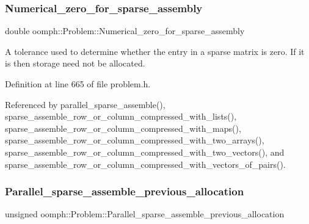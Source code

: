 \mbox{\label{classoomph_1_1Problem_ad1a1ffc2bd685377ce7213452876b127}} 
\subsubsection{\texorpdfstring{Numerical\+\_\+zero\+\_\+for\+\_\+sparse\+\_\+assembly}{Numerical\_zero\_for\_sparse\_assembly}}
{\footnotesize\ttfamily double oomph\+::\+Problem\+::\+Numerical\+\_\+zero\+\_\+for\+\_\+sparse\+\_\+assembly\hspace{0.3cm}{\ttfamily [protected]}}



A tolerance used to determine whether the entry in a sparse matrix is zero. If it is then storage need not be allocated. 



Definition at line 665 of file problem.\+h.



Referenced by parallel\+\_\+sparse\+\_\+assemble(), sparse\+\_\+assemble\+\_\+row\+\_\+or\+\_\+column\+\_\+compressed\+\_\+with\+\_\+lists(), sparse\+\_\+assemble\+\_\+row\+\_\+or\+\_\+column\+\_\+compressed\+\_\+with\+\_\+maps(), sparse\+\_\+assemble\+\_\+row\+\_\+or\+\_\+column\+\_\+compressed\+\_\+with\+\_\+two\+\_\+arrays(), sparse\+\_\+assemble\+\_\+row\+\_\+or\+\_\+column\+\_\+compressed\+\_\+with\+\_\+two\+\_\+vectors(), and sparse\+\_\+assemble\+\_\+row\+\_\+or\+\_\+column\+\_\+compressed\+\_\+with\+\_\+vectors\+\_\+of\+\_\+pairs().

\mbox{\label{classoomph_1_1Problem_a6a96b64a44cb378db1c0a07c562f7dae}} 
\subsubsection{\texorpdfstring{Parallel\+\_\+sparse\+\_\+assemble\+\_\+previous\+\_\+allocation}{Parallel\_sparse\_assemble\_previous\_allocation}}
{\footnotesize\ttfamily unsigned oomph\+::\+Problem\+::\+Parallel\+\_\+sparse\+\_\+assemble\+\_\+previous\+\_\+allocation\hspace{0.3cm}{\ttfamily [private]}}



